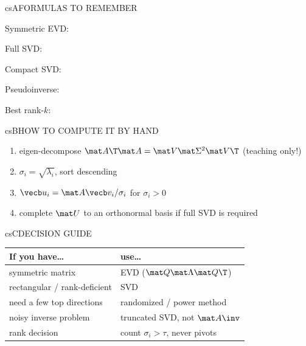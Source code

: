 \documentclass[../../../../master.tex]{subfiles}
\begin{document}
\csnextpage

\begin{cscolumns}
\begin{cscard}{csA}{FORMULAS TO REMEMBER}
  \begin{csbul}
    \item Symmetric EVD:
    \item Full SVD:
    \item Compact SVD:
    \item Pseudoinverse:
    \item Best rank-$k$:
  \end{csbul}
\end{cscard}

\begin{cscard}{csB}{HOW TO COMPUTE IT BY HAND}
  \begin{enumerate}[leftmargin=1.2em, itemsep=1pt, topsep=1pt, parsep=0pt]
    \item eigen-decompose $\mat A\T\mat A=\mat V\mat\Sigma^2\mat V\T$ (teaching only!)
    \item $\sigma_i=\sqrt{\lambda_i}$, sort descending
    \item $\vecb u_i=\mat A\vecb v_i/\sigma_i$ for $\sigma_i>0$
    \item complete $\mat U$ to an orthonormal basis if full SVD is required
  \end{enumerate}
\end{cscard}
\columnbreak

\begin{cscard}{csC}{DECISION GUIDE}
  \renewcommand{\arraystretch}{1.3}\small
  \begin{tabular}{@{}>{\raggedright\arraybackslash}p{3.3cm}>{\raggedright\arraybackslash}p{4.7cm}@{}}
    \textbf{If you have\ldots} & \textbf{use\ldots}\\ \hline
    symmetric matrix & EVD ($\mat Q\mat\Lambda\mat Q\T$)\\
    rectangular / rank-deficient & SVD\\
    need a few top directions & randomized / power method\\
    noisy inverse problem & truncated SVD, not $\mat A\inv$\\
    rank decision & count $\sigma_i>\tau$, never pivots\\
  \end{tabular}
\end{cscard}


\end{cscolumns}
\end{document}
